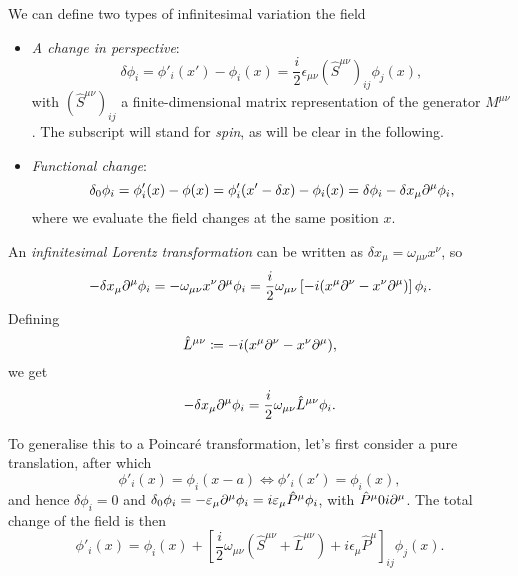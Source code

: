 We can define two types of infinitesimal variation the field
\begin{itemize}
    \item \emph{A change in perspective}:
    \begin{equation}
        \delta \phi_i = \phi'_i(x') - \phi_i(x) = \frac{i}{2} \epsilon_{\mu\nu} (\hat{S}^{\mu\nu})_{ij} \phi_j(x) ,
    \end{equation}
    with $(\hat{S}^{\mu\nu})_{ij}$ a finite-dimensional matrix representation of the generator $M^{\mu\nu}$. The subscript will stand for \emph{spin}, as will be clear in the following.
    \item \emph{Functional change}:
    \begin{equation}\label{eq:total-functional-variation}
        \delta_0 \phi_i = \phi'_i(x) - \phi(x) = \phi'_i (x' - \delta x) - \phi_i(x) = \delta \phi_i - \delta x_\mu \partial^\mu \phi_i ,
    \end{equation}
    where we evaluate the field changes at the same position $x$.
\end{itemize}

An \emph{infinitesimal Lorentz transformation} can be written as $\delta x_\mu = \omega_{\mu\nu} x^\nu$, so
\begin{equation*}
    -\delta x_\mu \partial^\mu \phi_i = - \omega_{\mu\nu} x^\nu \partial^\mu \phi_i = \frac{i}{2} \omega_{\mu\nu} \left[ -i (x^\mu \partial^\nu - x^\nu \partial^\mu) \right] \phi_i .
\end{equation*} 
Defining
\begin{equation}
    {\hat{L}}^{\mu\nu} \coloneq -i (x^\mu \partial^\nu - x^\nu \partial^\mu),
\end{equation}
we get
\begin{equation}
    -\delta x_\mu \partial^\mu \phi_i = \frac{i}{2} \omega_{\mu\nu} {\hat{L}}^{\mu\nu} \phi_i.
\end{equation}

To generalise this to a Poincaré transformation, let's first consider a pure translation, after which
\begin{equation}
    \phi'_i(x) = \phi_i (x-a) \iff \phi'_i(x') = \phi_i(x) ,
\end{equation}
and hence $\delta \phi_i = 0$ and $\delta_0 \phi_i = - \varepsilon_\mu \partial^\mu \phi_i = i \varepsilon_\mu \hat{P}^\mu \phi_i$, with $\hat{P}^\mu 0 i \partial^\mu$. The total change of the field is then
\begin{equation}
    \phi'_i(x) = \phi_i(x) + \left[ \frac{i}{2} \omega_{\mu\nu} ({\hat{S}}^{\mu\nu} + {\hat{L}}^{\mu\nu}) + i \epsilon_\mu \hat{P}^\mu \right]_{ij} \phi_j(x) .
\end{equation}

